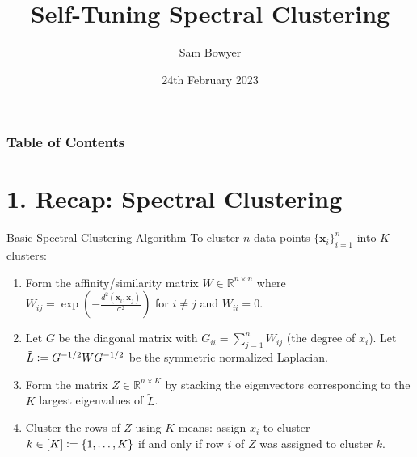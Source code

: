 \documentclass[aspectratio=169]{beamer}
\title[Short Title]{Self-Tuning Spectral Clustering}
\author{Sam Bowyer}
\institute{Statistical Methods 2}
\date{24th February 2023}
\begin{document}



\begin{frame}[leftcolor=white,rightcolor=UniversityRed,div=0.8\paperwidth]
  \titlepage
\end{frame}


\begin{frame}
\frametitle{Table of Contents}
\tableofcontents
\end{frame}

\section{1. Recap: Spectral Clustering}
\begin{frame}{Basic Spectral Clustering Algorithm}
    To cluster $n$ data points $\{\mathbf{x}_i\}_{i=1}^n$ into $K$ clusters:
    \begin{enumerate}[<+->]
      \item Form the affinity/similarity matrix $W \in \mathbb{R}^{n \times n}$ where $W_{ij} = \exp\left(-\frac{d^2(\mathbf{x}_i, \mathbf{x}_j)}{\sigma^2}\right)$ for $i \neq j$ and $W_{ii} = 0$.
      \item Let $G$ be the diagonal matrix with $G_{ii} = \sum_{j=1}^n W_{ij}$ (the degree of $x_i$).
      Let $\tilde{L} \vcentcolon = G^{-1/2} W G^{-1/2}$ be the symmetric normalized Laplacian.
      \item Form the matrix $Z \in \mathbb{R}^{n \times K}$ by stacking the eigenvectors corresponding to the $K$ largest eigenvalues of $\tilde{L}$.
      \item Cluster the rows of $Z$ using $K$-means: assign $x_i$ to cluster $k \in [K] \vcentcolon= \{1, \ldots, K\}$ if and only if row $i$ of $Z$ was assigned to cluster $k$.
    \end{enumerate}
    \cite{ng_spectral_2001}

\end{frame}
\end{document}
